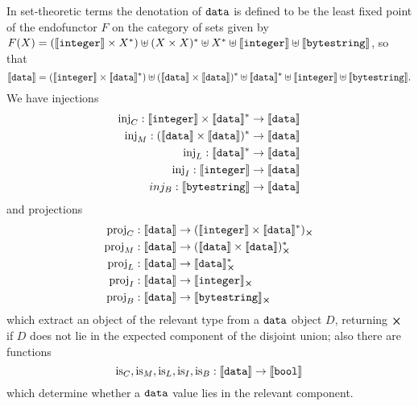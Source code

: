 \noindent In set-theoretic terms the denotation of $\mathtt{data}$ is
defined to be the least fixed point of the endofunctor $F$ on the category of
sets given by $F(X) = (\llbracket\mathit{\mathtt{integer}}\rrbracket \times X^*) \uplus (X \times X)^* \uplus
X^* \uplus \llbracket\mathit{\mathtt{integer}}\rrbracket \uplus \llbracket\mathit{\mathtt{bytestring}}\rrbracket$, so that
$$ \llbracket\mathit{\mathtt{data}}\rrbracket = (\llbracket\mathit{\mathtt{integer}}\rrbracket \times \llbracket\mathit{\mathtt{data}}\rrbracket^*)
               \uplus (\llbracket\mathit{\mathtt{data}}\rrbracket \times \llbracket\mathit{\mathtt{data}}\rrbracket)^*
               \uplus \llbracket\mathit{\mathtt{data}}\rrbracket^*
               \uplus \llbracket\mathit{\mathtt{integer}}\rrbracket
               \uplus \llbracket\mathit{\mathtt{bytestring}}\rrbracket.
$$
We have injections
\begin{align*}
  \operatorname{inj}_C: \llbracket\mathit{\mathtt{integer}}\rrbracket \times \llbracket\mathit{\mathtt{data}}\rrbracket^* & \to \llbracket\mathit{\mathtt{data}}\rrbracket \\
  \operatorname{inj}_M: (\llbracket\mathit{\mathtt{data}}\rrbracket \times \llbracket\mathit{\mathtt{data}}\rrbracket)^*  & \to \llbracket\mathit{\mathtt{data}}\rrbracket \\
  \operatorname{inj}_L: \llbracket\mathit{\mathtt{data}}\rrbracket^* & \to \llbracket\mathit{\mathtt{data}}\rrbracket \\
  \operatorname{inj}_I: \llbracket\mathit{\mathtt{integer}}\rrbracket & \to \llbracket\mathit{\mathtt{data}}\rrbracket \\
  inj_B: \llbracket\mathit{\mathtt{bytestring}}\rrbracket & \to \llbracket\mathit{\mathtt{data}}\rrbracket \\
\end{align*}
\noindent and projections
\begin{align*}
  \proj_C: \denote{\ty{data}} & \to \withError{(\denote{\ty{integer}} \times \denote{\ty{data}}^*)}\\
  \proj_M: \denote{\ty{data}} & \to \withError{(\denote{\ty{data}} \times \denote{\ty{data}})^*}\\
  \proj_L: \denote{\ty{data}} & \to \withError{\denote{\ty{data}}^* }\\
  \proj_I: \denote{\ty{data}} & \to \withError{\denote{\ty{integer}}}\\
  \proj_B: \denote{\ty{data}} & \to \withError{\denote{\ty{bytestring}} }\\
\end{align*}
\noindent which extract an object of the relevant type from a $\mathtt{data}$ object
$D$, returning $\errorX$ if $D$ does not lie in the expected component of the
disjoint union; also there are functions
$$
\operatorname{is}_C, \operatorname{is}_M, \operatorname{is}_L, \operatorname{is}_I, \operatorname{is}_B: \llbracket\mathit{\mathtt{data}}\rrbracket \to \llbracket\mathit{\mathtt{bool}}\rrbracket
$$
\noindent which determine whether a $\mathtt{data}$ value lies in the relevant component.

